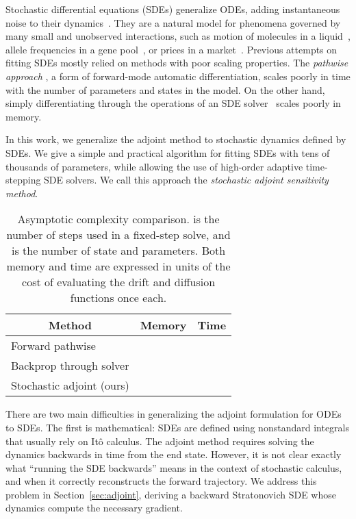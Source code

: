\documentclass[twoside]{article}
\begin{document}
Stochastic differential equations (SDEs) generalize ODEs, adding instantaneous noise to their dynamics~\cite{oksendal2003stochastic,sarkka2019applied,sarkka2013bayesian}.
They are a natural model for phenomena governed by many small and unobserved interactions, such as motion of molecules in a liquid~\cite{brown1828xxvii}, allele frequencies in a gene pool~\cite{ewens2012mathematical}, or prices in a market~\cite{shreve2004stochastic}.
Previous attempts on fitting SDEs mostly relied on methods with poor scaling properties.
The \textit{pathwise approach} \cite{gobet2005sensitivity,yang1991monte}, 
a form of forward-mode automatic differentiation, scales poorly in time with the number of parameters and states in the model.
On the other hand, simply differentiating through the operations of an SDE solver~\cite{giles2006smoking} scales poorly in memory.

In this work, we generalize the adjoint method to stochastic dynamics defined by SDEs.
We give a simple and practical algorithm for fitting SDEs with tens of thousands of parameters, while allowing the use of high-order adaptive time-stepping SDE solvers. We call this approach the \textit{stochastic adjoint sensitivity method}. 


\begin{table}[h!]
	\setlength{\tabcolsep}{4pt}
	\label{tab:complexity}
	\centering
	\begin{tabular}{lll}
		\toprule
		\multicolumn{1}{c}{Method} & \multicolumn{1}{c}{Memory} & \multicolumn{1}{c}{Time} \\
		\midrule
		Forward pathwise \cite{yang1991monte,gobet2005sensitivity} &  &  \\
		Backprop through solver \cite{giles2006smoking} &  &  \\
		{Stochastic adjoint (ours)} &  &  \\
		\bottomrule
	\end{tabular}
	\vspace{-1mm}
	\caption{Asymptotic complexity comparison.
		 is the number of steps used in a fixed-step solve, and  is the number of state and parameters.
		Both memory and time are expressed in units of the cost of evaluating the drift and diffusion functions once each.
}
\end{table}


There are two main difficulties in generalizing the adjoint formulation for ODEs to SDEs.
The first is mathematical: 
SDEs are defined using nonstandard integrals that usually rely on It\^o calculus.
The adjoint method requires
solving the dynamics backwards in time from the end state. However, it is not clear exactly what ``running the SDE backwards'' means in the context of stochastic calculus, and when it correctly reconstructs the forward trajectory.
We address this problem in Section~\ref{sec:adjoint}, deriving a backward Stratonovich SDE whose dynamics compute the necessary gradient.
\end{document}
